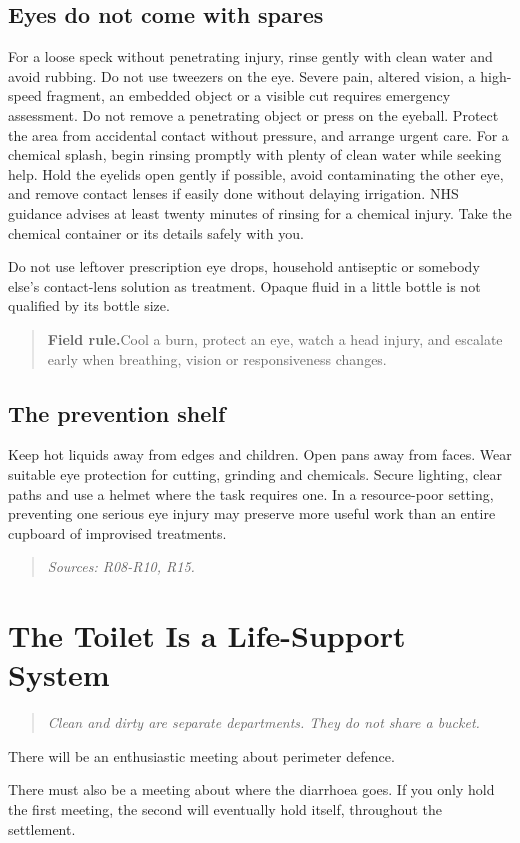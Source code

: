 \documentclass[10pt,openright]{book}
\newcommand{\fieldrule}[1]{\begin{quote}\textbf{Field rule.}\enspace #1\end{quote}}
\begin{document}
\section*{Eyes do not come with spares}
For a loose speck without penetrating injury, rinse gently with clean water and avoid rubbing. Do not use tweezers on the eye. Severe pain, altered vision, a high-speed fragment, an embedded object or a visible cut requires emergency assessment. Do not remove a penetrating object or press on the eyeball. Protect the area from accidental contact without pressure, and arrange urgent care. For a chemical splash, begin rinsing promptly with plenty of clean water while seeking help. Hold the eyelids open gently if possible, avoid contaminating the other eye, and remove contact lenses if easily done without delaying irrigation. NHS guidance advises at least twenty minutes of rinsing for a chemical injury. Take the chemical container or its details safely with you.

Do not use leftover prescription eye drops, household antiseptic or somebody else's contact-lens solution as treatment. Opaque fluid in a little bottle is not qualified by its bottle size.

\fieldrule{Cool a burn, protect an eye, watch a head injury, and escalate early when breathing, vision or responsiveness changes.}
\section*{The prevention shelf}
Keep hot liquids away from edges and children. Open pans away from faces. Wear suitable eye protection for cutting, grinding and chemicals. Secure lighting, clear paths and use a helmet where the task requires one. In a resource-poor setting, preventing one serious eye injury may preserve more useful work than an entire cupboard of improvised treatments.

\begin{quote}\emph{Sources: R08-R10, R15.}\end{quote}
\chapter{The Toilet Is a Life-Support System}
\begin{quote}\emph{Clean and dirty are separate departments. They do not share a bucket.}\end{quote}
There will be an enthusiastic meeting about perimeter defence.

There must also be a meeting about where the diarrhoea goes. If you only hold the first meeting, the second will eventually hold itself, throughout the settlement.
\end{document}
